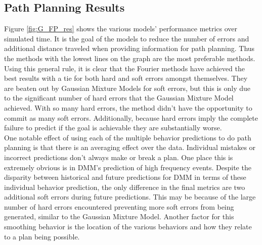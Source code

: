 \begin{table}[htb!]
  \centering
  \caption{Future Path Planning Results}
  \label{table:Future_Path_Planning_Results}
\end{table}




\subsection{ Path Planning Results }

Figure \ref{fig:G_FP_res} shows the various models' performance metrics over
simulated time. It is the goal of the models to reduce the number of errors
and additional distance traveled when providing information for path planning.
Thus the methods with the lowest lines on the graph are the most
preferable methods. Using this general rule, it is clear that the Fourier
methods have achieved the best results with a tie for both hard and soft errors
amongst themselves. They are beaten out by Gaussian Mixture Models for soft
errors, but this is only due to the significant number of hard errors that
the Gaussian Mixture Model achieved. With so many hard errors, the method
didn't have the opportunity to commit as many soft errors. Additionally,
because hard errors imply the complete failure to predict if the goal is
achievable they are substantially worse. \\

One notable effect of using each of the multiple behavior predictions to do path
planning is that there is an averaging effect over the data. Individual mistakes
or incorrect predictions don't always make or break a plan. One place this is
extremely obvious is in DMM's prediction of high frequency events.
Despite the disparity between historical and future predictions for DMM in
terms of these individual behavior prediction, the only difference in the final
metrics are two additional soft errors during future predictions. This may be
because of the large number of hard errors encountered preventing more
soft errors from being generated, similar to the Gaussian Mixture Model.
Another factor for this smoothing behavior is the location of the
various behaviors and how they relate to a plan being possible. \\

